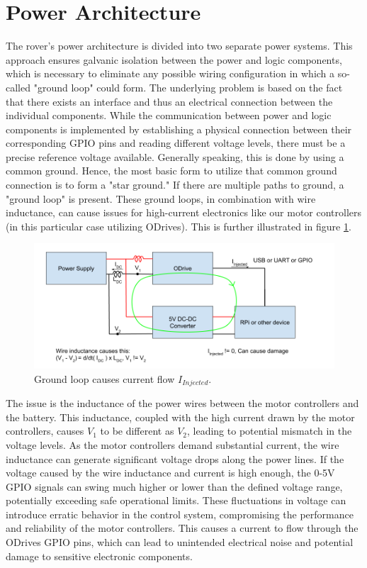     \clearpage
\section{Power Architecture}

    The rover's power architecture is divided into two separate power systems. This approach ensures galvanic isolation between the power and logic components, which is necessary to eliminate any possible wiring configuration in which a so-called "ground loop" could form. The underlying problem is based on the fact that there exists an interface and thus an electrical connection between the individual components. While the communication between power and logic components is implemented by establishing a physical connection between their corresponding GPIO pins and reading different voltage levels, there must be a precise reference voltage available. Generally speaking, this is done by using a common ground. Hence, the most basic form to utilize that common ground connection is to form a "star ground." If there are multiple paths to ground, a "ground loop" is present. These ground loops, in combination with wire inductance, can cause issues for high-current electronics like our motor controllers (in this particular case utilizing ODrives). This is further illustrated in figure \ref{ground_loop_bad}.
    
    \begin{figure}[h]
    \includegraphics[width=\textwidth]{contents/figures/ground_loop_bad.png}
    \caption{Ground loop causes current flow $I_{Injected}$.}
    \label{ground_loop_bad}
    \end{figure}
    
    The issue is the inductance of the power wires between the motor controllers and the battery. This inductance, coupled with the high current drawn by the motor controllers, causes $V_1$ to be different as $V_2$, leading to potential mismatch in the voltage levels. As the motor controllers demand substantial current, the wire inductance can generate significant voltage drops along the power lines. If the voltage caused by the wire inductance and current is high enough, the 0-5V GPIO signals can swing much higher or lower than the defined voltage range, potentially exceeding safe operational limits. These fluctuations in voltage can introduce erratic behavior in the control system, compromising the performance and reliability of the motor controllers. This causes a current to flow through the ODrives GPIO pins, which can lead to unintended electrical noise and potential damage to sensitive electronic components.

